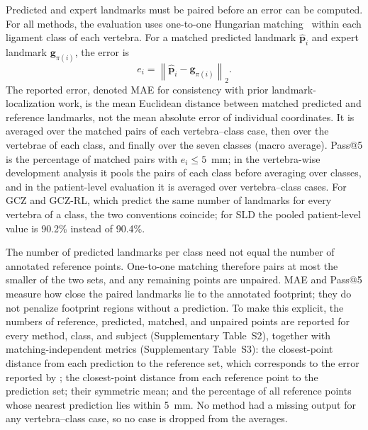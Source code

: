 \documentclass[5p,times,twocolumn,authoryear]{elsarticle}
\begin{document}
Predicted and expert landmarks must be paired before an error can be computed. For all methods, the evaluation uses one-to-one Hungarian matching~\citep{kuhn1955} within each ligament class of each vertebra. For a matched predicted landmark $\hat{\mathbf{p}}_i$ and expert landmark $\mathbf{g}_{\pi(i)}$, the error is
\begin{equation}
  e_i = \left\|\hat{\mathbf{p}}_i - \mathbf{g}_{\pi(i)}\right\|_2 .
  \label{eq:error}
\end{equation}
The reported error, denoted MAE for consistency with prior landmark-localization work, is the mean Euclidean distance between matched predicted and reference landmarks, not the mean absolute error of individual coordinates. It is averaged over the matched pairs of each vertebra--class case, then over the vertebrae of each class, and finally over the seven classes (macro average). Pass@5 is the percentage of matched pairs with $e_i \le 5$~mm; in the vertebra-wise development analysis it pools the pairs of each class before averaging over classes, and in the patient-level evaluation it is averaged over vertebra--class cases. For GCZ and GCZ-RL, which predict the same number of landmarks for every vertebra of a class, the two conventions coincide; for SLD the pooled patient-level value is 90.2\% instead of 90.4\%.

The number of predicted landmarks per class need not equal the number of annotated reference points. One-to-one matching therefore pairs at most the smaller of the two sets, and any remaining points are unpaired. MAE and Pass@5 measure how close the paired landmarks lie to the annotated footprint; they do not penalize footprint regions without a prediction. To make this explicit, the numbers of reference, predicted, matched, and unpaired points are reported for every method, class, and subject (Supplementary Table~S2), together with matching-independent metrics (Supplementary Table~S3): the closest-point distance from each prediction to the reference set, which corresponds to the error reported by \citet{blomenkamp2026sld}; the closest-point distance from each reference point to the prediction set; their symmetric mean; and the percentage of all reference points whose nearest prediction lies within 5~mm. No method had a missing output for any vertebra--class case, so no case is dropped from the averages.
\end{document}
